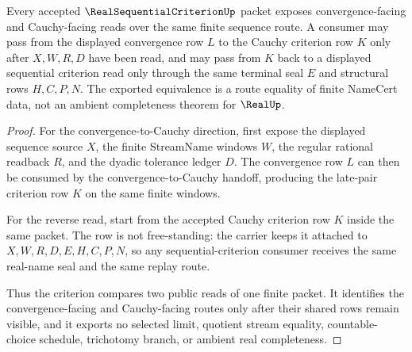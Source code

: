 \begin{theorem}
\label{thm:real-sequential-criterion-cauchy-equivalence}
Every accepted $\RealSequentialCriterionUp$ packet exposes convergence-facing and Cauchy-facing reads over the same finite sequence route. A consumer may pass from the displayed convergence row $L$ to the Cauchy criterion row $K$ only after $X,W,R,D$ have been read, and may pass from $K$ back to a displayed sequential criterion read only through the same terminal seal $E$ and structural rows $H,C,P,N$. The exported equivalence is a route equality of finite NameCert data, not an ambient completeness theorem for $\RealUp$.
\end{theorem}
\begin{proof}
For the convergence-to-Cauchy direction, first expose the displayed sequence source $X$, the finite StreamName windows $W$, the regular rational readback $R$, and the dyadic tolerance ledger $D$. The convergence row $L$ can then be consumed by the convergence-to-Cauchy handoff, producing the late-pair criterion row $K$ on the same finite windows.

For the reverse read, start from the accepted Cauchy criterion row $K$ inside the same packet. The row is not free-standing: the carrier keeps it attached to $X,W,R,D,E,H,C,P,N$, so any sequential-criterion consumer receives the same real-name seal and the same replay route.

Thus the criterion compares two public reads of one finite packet. It identifies the convergence-facing and Cauchy-facing routes only after their shared rows remain visible, and it exports no selected limit, quotient stream equality, countable-choice schedule, trichotomy branch, or ambient real completeness.
\end{proof}



